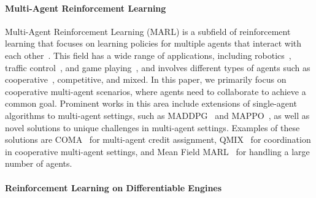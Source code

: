 \paragraph{Multi-Agent Reinforcement Learning}
Multi-Agent Reinforcement Learning (MARL) is a subfield of reinforcement learning that focuses on learning policies for multiple agents that interact with each other~\cite{albrecht2024multi}. 
This field has a wide range of applications, 
including robotics~\cite{DBLP:journals/air/ChungFYN24}, 
traffic control~\cite{DBLP:journals/tits/ChuWCL20}, 
and game playing~\cite{DBLP:conf/iclr/BakerKMWPMM20,jaderberg2019human}, 
and involves different types of agents such as cooperative~\cite{DBLP:journals/corr/abs-2312-05162}, competitive, and mixed. 
In this paper, we primarily focus on cooperative multi-agent scenarios, 
where agents need to collaborate to achieve a common goal. 
Prominent works in this area include extensions of single-agent algorithms to multi-agent settings, 
such as MADDPG~\cite{DBLP:conf/nips/LoweWTHAM17} and MAPPO~\cite{DBLP:conf/nips/YuVVGWBW22}, 
as well as novel solutions to unique challenges in multi-agent settings. Examples of these solutions are COMA~\cite{DBLP:conf/aaai/FoersterFANW18} for multi-agent credit assignment, 
QMIX~\cite{DBLP:conf/icml/RashidSWFFW18} for coordination in cooperative multi-agent settings, 
and Mean Field MARL~\cite{DBLP:conf/icml/YangLLZZW18} for handling a large number of agents.

\paragraph{Reinforcement Learning on Differentiable Engines}


